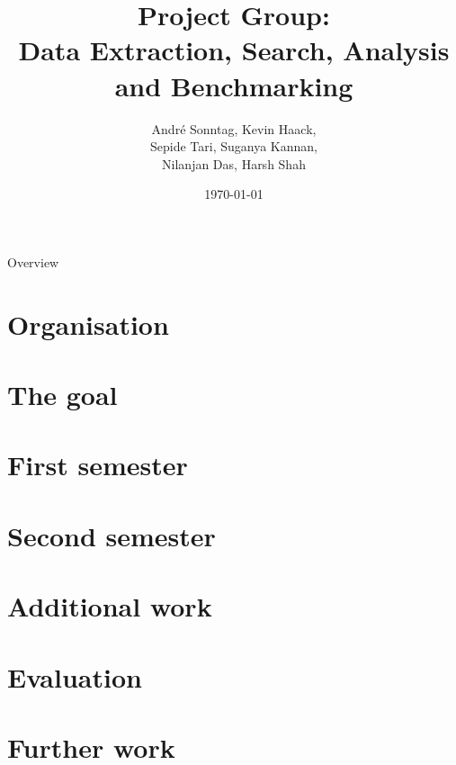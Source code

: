 \documentclass{beamer}
\title{Project Group:\\Data Extraction, Search, Analysis and Benchmarking}
\author{André Sonntag, Kevin Haack,\\Sepide Tari, Suganya Kannan,\\Nilanjan Das, Harsh Shah}
\institute{Paderborn University}
\date{\today}
\begin{document}
\begin{frame}
  \titlepage
\end{frame}

\begin{frame}{Overview}
\tableofcontents
\end{frame}

\section{Organisation}



\section{The goal}


\section{First semester}











\section{Second semester}
















\section{Additional work}


\section{Evaluation}


\section{Further work}

\end{document}
